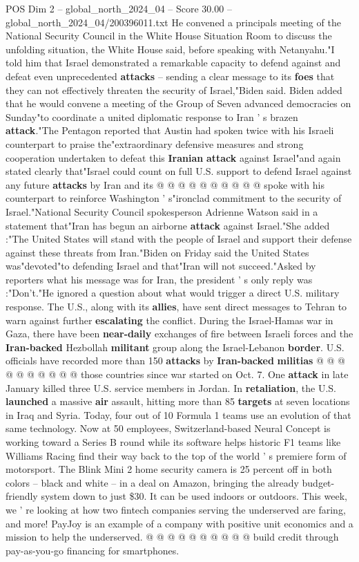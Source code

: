\begin{textsample}{POS Dim 2 – global\_north\_2024\_04 – Score 30.00 – global\_north\_2024\_04/200396011.txt}
He convened a principals meeting of the National Security Council in the White House Situation Room to discuss the unfolding situation, the White House said, before speaking with Netanyahu."I told him that Israel demonstrated a remarkable capacity to defend against and defeat even unprecedented \textbf{attacks} -- sending a clear message to its \textbf{foes} that they can not effectively threaten the security of Israel,"Biden said.
Biden added that he would convene a meeting of the Group of Seven advanced democracies on Sunday"to coordinate a united diplomatic response to Iran ' s brazen \textbf{attack}."The Pentagon reported that Austin had spoken twice with his Israeli counterpart to praise the"extraordinary defensive measures and strong cooperation undertaken to defeat this \textbf{Iranian} \textbf{attack} against Israel"and again stated clearly that"Israel could count on full U.S. support to defend Israel against any future \textbf{attacks} by Iran and its @ @ @ @ @ @ @ @ @ @ spoke with his counterpart to reinforce Washington ' s"ironclad commitment to the security of Israel."National Security Council spokesperson Adrienne Watson said in a statement that"Iran has begun an airborne \textbf{attack} against Israel."She added :"The United States will stand with the people of Israel and support their defense against these threats from Iran."Biden on Friday said the United States was"devoted"to defending Israel and that"Iran will not succeed."Asked by reporters what his message was for Iran, the president ' s only reply was :"Don't."He ignored a question about what would trigger a direct U.S. military response.
The U.S., along with its \textbf{allies}, have sent direct messages to Tehran to warn against further \textbf{escalating} the conflict.
During the Israel-Hamas war in Gaza, there have been \textbf{near-daily} exchanges of fire between Israeli forces and the \textbf{Iran-backed} Hezbollah \textbf{militant} group along the Israel-Lebanon \textbf{border}.
U.S. officials have recorded more than 150 \textbf{attacks} by \textbf{Iran-backed} \textbf{militias} @ @ @ @ @ @ @ @ @ @ those countries since war started on Oct. 7.
One \textbf{attack} in late January killed three U.S. service members in Jordan.
In \textbf{retaliation}, the U.S. \textbf{launched} a massive \textbf{air} assault, hitting more than 85 \textbf{targets} at seven locations in Iraq and Syria.
Today, four out of 10 Formula 1 teams use an evolution of that same technology.
Now at 50 employees, Switzerland-based Neural Concept is working toward a Series B round while its software helps historic F1 teams like Williams Racing find their way back to the top of the world ' s premiere form of motorsport.
The Blink Mini 2 home security camera is 25 percent off in both colors -- black and white -- in a deal on Amazon, bringing the already budget-friendly system down to just \$30.
It can be used indoors or outdoors.
This week, we ' re looking at how two fintech companies serving the underserved are faring, and more!
PayJoy is an example of a company with positive unit economics and a mission to help the underserved. @ @ @ @ @ @ @ @ @ @ build credit through pay-as-you-go financing for smartphones.


\end{textsample}

